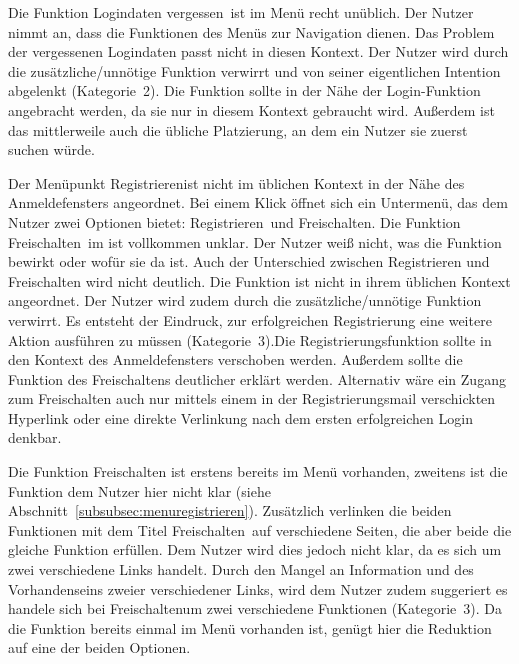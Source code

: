 {Die Funktion \glqq Logindaten vergessen\grqq~ist im Menü recht unüblich. Der Nutzer nimmt an, dass die Funktionen des Menüs zur Navigation dienen. Das Problem der vergessenen Logindaten passt nicht in diesen Kontext.
}
{Der Nutzer wird durch die zusätzliche/unnötige Funktion verwirrt und von seiner eigentlichen Intention abgelenkt (Kategorie~2).
}
{Die Funktion sollte in der Nähe der Login-Funktion angebracht werden, da sie nur in diesem Kontext gebraucht wird. Außerdem ist das mittlerweile auch die übliche Platzierung, an dem ein Nutzer sie zuerst suchen würde.
}

{Der Menüpunkt \glqq Registrieren\grqq ist nicht im üblichen Kontext in der Nähe des Anmeldefensters angeordnet. Bei einem Klick öffnet sich ein Untermenü, das dem Nutzer zwei Optionen bietet: \glqq Registrieren\grqq~und \glqq Freischalten\grqq.
Die Funktion \glqq Freischalten\grqq~im ist vollkommen unklar. Der Nutzer weiß nicht, was die Funktion bewirkt oder wofür sie da ist. Auch der Unterschied zwischen Registrieren und Freischalten wird nicht deutlich.
}{Die Funktion ist nicht in ihrem üblichen Kontext angeordnet. Der Nutzer wird zudem durch die zusätzliche/unnötige Funktion verwirrt. Es entsteht der Eindruck, zur erfolgreichen Registrierung eine weitere Aktion ausführen zu müssen (Kategorie~3).}{Die Registrierungsfunktion sollte in den Kontext des Anmeldefensters verschoben werden. Außerdem sollte die Funktion des Freischaltens deutlicher erklärt werden. Alternativ wäre ein Zugang zum Freischalten auch nur mittels einem in der Registrierungsmail verschickten Hyperlink oder eine direkte Verlinkung nach dem ersten erfolgreichen Login denkbar.
}

{Die Funktion Freischalten ist erstens bereits im Menü vorhanden, zweitens ist die Funktion dem Nutzer hier nicht klar (siehe Abschnitt~\ref{subsubsec:menuregistrieren}). 
Zusätzlich verlinken die beiden Funktionen mit dem Titel \glqq Freischalten\grqq~auf verschiedene Seiten, die aber beide die gleiche Funktion erfüllen. Dem Nutzer wird dies jedoch nicht klar, da es sich um zwei verschiedene Links handelt.
}
{Durch den Mangel an Information und des Vorhandenseins zweier verschiedener Links, wird dem Nutzer zudem suggeriert es handele sich bei \glqq Freischalten\grqq um zwei verschiedene Funktionen (Kategorie~3).
}
{
Da die Funktion bereits einmal im Menü vorhanden ist, genügt hier die Reduktion auf eine der beiden Optionen.
}

